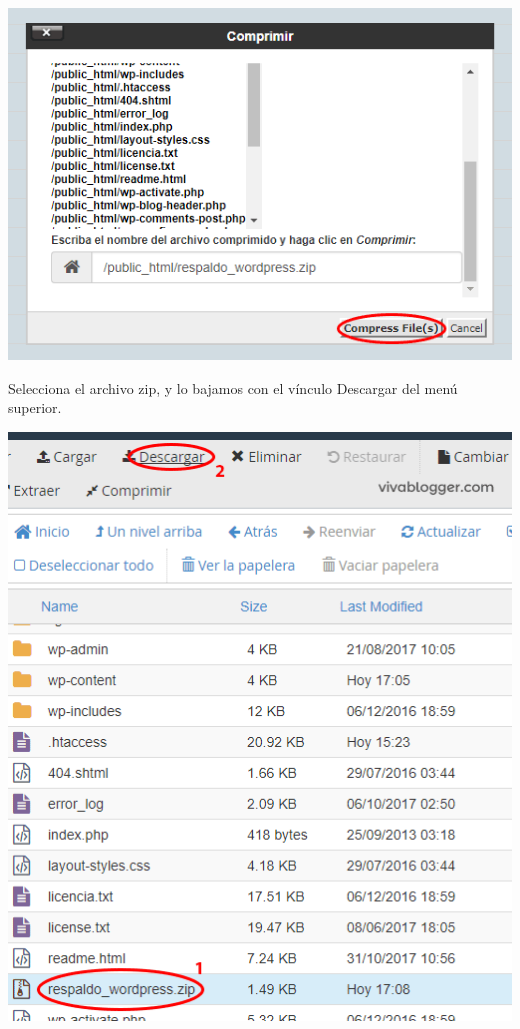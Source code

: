 \begin{enumerate}
		\begin{center}
			\includegraphics[scale=0.4]{image/migra7.png}
		\end{center}
		
		Selecciona el archivo zip, y lo bajamos con el vínculo Descargar del menú superior.
		
		\begin{center}
			\includegraphics[scale=0.5]{image/migra8.png}
		\end{center}
		

\end{enumerate}

